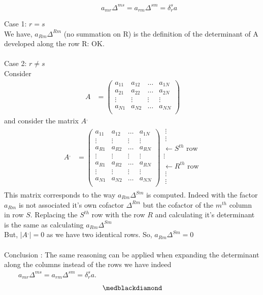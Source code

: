 \begin{tcolorbox}
           $$\quad\quad a_{mr}\Delta^{ms} = a_{rm}\Delta^{sm} = \delta^s_r a$$
\end{tcolorbox}
Case 1: $r =s$\\
We have, $a_{Rm}\Delta^{Rm}$ (no summation on R) is the definition of the determinant of A developed along the row R: OK.\\\\
Case 2: $r \neq s$\\
Consider
\begin{align}
\ A &= \begin{pmatrix}
 a_{11} & a_{12}&\dots&a_{1N} \\
a_{21} & a_{22}&\dots&a_{2N} \\
\vdots & \vdots &\vdots & \vdots \\
a_{N1} & a_{N2}&\dots&a_{NN} \\
\end{pmatrix}
\end{align}
and consider the matrix $A^,$
\begin{align}
\ A^, &= \begin{pmatrix}
 a_{11} & a_{12}&\dots&a_{1N} \\
 \vdots & \vdots &\vdots & \vdots \\
a_{R1} & a_{R2}&\dots&a_{RN} \\
\vdots & \vdots &\vdots & \vdots \\
a_{R1} & a_{R2}&\dots&a_{RN} \\
\vdots & \vdots &\vdots & \vdots \\
a_{N1} & a_{N2}&\dots&a_{NN} \\
\end{pmatrix}
\begin{array}{c}
\ \vdots\\
\ \vdots\\
\leftarrow S^{th}\text{ row}\\
\vdots\\
\leftarrow R^{th}\text{ row}\\
\ \vdots\\
\ \vdots\\
\end{array}
\end{align}
This matrix corresponds to the way $a_{Rm}\Delta^{Sm}$ is computed. Indeed with the factor $a_{Rm}$ is not associated it's own cofactor $\Delta^{Rm}$ but the cofactor of the $m^{th}$ column in row $S$. Replacing the $S^{th}$ row with the row $R$ and calculating it's determinant is the same as calculating $a_{Rm}\Delta^{Sm}$\\
But, $|A^,| = 0$ as we have two identical rows. So, $a_{Rm}\Delta^{Sm} = 0$\\\\
Conclusion : The same reasoning can be applied when expanding the determinant along the columns instead of the rows we have indeed $\quad\quad a_{mr}\Delta^{ms} = a_{rm}\Delta^{sm} = \delta^s_r a$.
$$\medblackdiamond$$
\newpage


